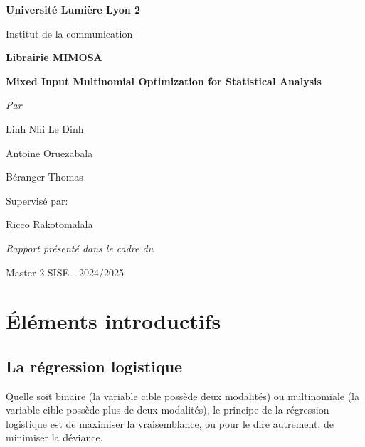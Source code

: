 \documentclass[10pt,french]{report}
\begin{document}
	\begin{titlepage}
		\centering
		{\Large\bfseries Université Lumière Lyon 2}\par
		{\large Institut de la communication}\par\vspace{4.5cm}


		{\Huge\bfseries Librairie MIMOSA}\par\vspace{1cm}
		{\huge\bfseries Mixed Input Multinomial Optimization for Statistical Analysis}\par\vspace{4.5cm}

		{\Large\itshape Par}\par
		{\Large Linh Nhi Le Dinh}\par
		{\Large Antoine Oruezabala}\par
		{\Large Béranger Thomas}\par\vspace{1cm}

		{\large Supervisé par:}\par
		{\large Ricco Rakotomalala}\par\vspace{1cm}

		{\large\itshape Rapport présenté dans le cadre du}\par
		{\large Master 2 SISE - 2024/2025}\par\vspace{1cm}


		\vfill

	\end{titlepage}

	\tableofcontents

	\setlength{\parskip}{12pt}

	\chapter{Éléments introductifs}

	\section{La régression logistique}

	Quelle soit binaire (la variable cible possède deux modalités) ou multinomiale (la variable cible possède plus de deux modalités), le principe de la régression logistique est de maximiser la vraisemblance, ou pour le dire autrement, de minimiser la déviance.
\end{document}
